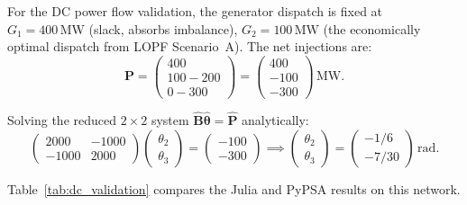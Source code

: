 For the DC power flow validation, the generator dispatch is fixed at $G_1 = 400\,\text{MW}$ (slack, absorbs imbalance), $G_2 = 100\,\text{MW}$ (the economically optimal dispatch from LOPF Scenario~A). The net injections are:
\begin{equation}
    \mathbf{P} = \begin{pmatrix} 400 \\ 100 - 200 \\ 0 - 300 \end{pmatrix} = \begin{pmatrix} 400 \\ -100 \\ -300 \end{pmatrix}\,\text{MW}.
\end{equation}

Solving the reduced $2 \times 2$ system $\hat{\mathbf{B}}\hat{\boldsymbol{\theta}} = \hat{\mathbf{P}}$ analytically:
\begin{equation}
    \begin{pmatrix} 2000 & -1000 \\ -1000 & 2000 \end{pmatrix}
    \begin{pmatrix} \theta_2 \\ \theta_3 \end{pmatrix}
    = \begin{pmatrix} -100 \\ -300 \end{pmatrix}
    \implies
    \begin{pmatrix} \theta_2 \\ \theta_3 \end{pmatrix}
    = \begin{pmatrix} -1/6 \\ -7/30 \end{pmatrix}\,\text{rad}.
\end{equation}

Table~\ref{tab:dc_validation} compares the Julia and PyPSA results on this network.

